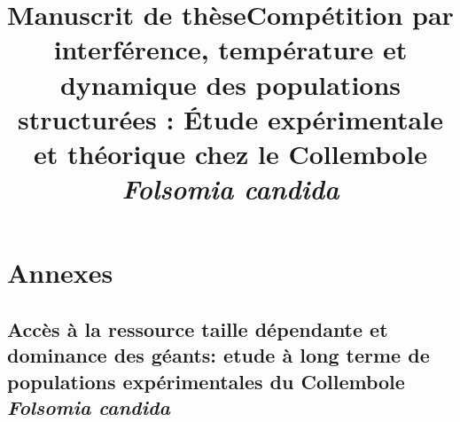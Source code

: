 \documentclass[12pt,a4paper,twoside,openright,final]{memoir}
\title{Manuscrit de thèse}
\numberwithin{chapter}{part}
\begin{document}
\frontmatter




\begin{Spacing}{1}





\tableofcontents

\end{Spacing}


\mainmatter

\title{Compétition par interférence, température et dynamique des populations
structurées : \'Etude expérimentale et théorique chez le Collembole
\textit{Folsomia candida}}
\newpage

 

\part{Annexes}
\appendix


% 



%
% 

\chapter[Accès à la ressource taille dépendante et dominance
des géants: etude à long terme de populations expérimentales du Collembole
\textit{Folsomia candida}][Etude à long terme]{Accès à la ressource taille
dépendante et dominance des géants: etude à long terme de populations
expérimentales du Collembole
\textit{Folsomia candida}}\label{chap:3-1}




\end{document}
